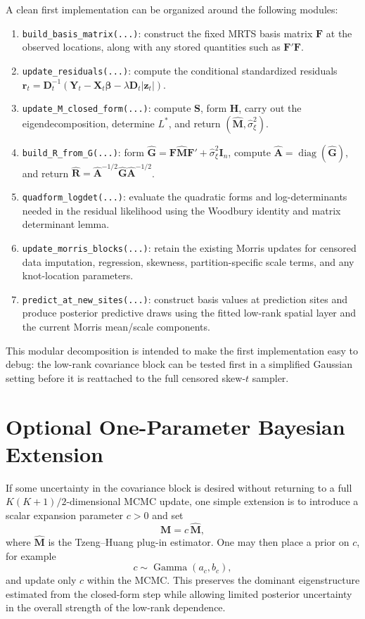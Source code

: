\documentclass[11pt]{article}
\newcommand{\bY}{\mathbf{Y}}
\newcommand{\bX}{\mathbf{X}}
\newcommand{\bD}{\mathbf{D}}
\newcommand{\bF}{\mathbf{F}}
\newcommand{\bH}{\mathbf{H}}
\newcommand{\bG}{\mathbf{G}}
\newcommand{\bM}{\mathbf{M}}
\newcommand{\bR}{\mathbf{R}}
\newcommand{\bA}{\mathbf{A}}
\newcommand{\bS}{\mathbf{S}}
\newcommand{\bz}{\mathbf{z}}
\newcommand{\br}{\mathbf{r}}
\newcommand{\diag}{\operatorname{diag}}
\newcommand{\I}{\mathbf{I}}
\begin{document}
A clean first implementation can be organized around the following modules:
\begin{enumerate}[leftmargin=2em]
\item \texttt{build\_basis\_matrix(...)}:
construct the fixed MRTS basis matrix $\bF$ at the observed locations, along
with any stored quantities such as $\bF' \bF$.
\item \texttt{update\_residuals(...)}:
compute the conditional standardized residuals
$\br_t = \bD_t^{-1}(\bY_t - \bX_t \bm{\beta} - \lambda \bD_t |\bz_t|)$.
\item \texttt{update\_M\_closed\_form(...)}:
compute $\bS$, form $\bH$, carry out the eigendecomposition, determine $L^*$,
and return $(\widehat{\bM}, \widehat{\sigma}_\xi^2)$.
\item \texttt{build\_R\_from\_G(...)}:
form $\widehat{\bG} = \bF \widehat{\bM} \bF' + \widehat{\sigma}_\xi^2 \I_n$,
compute $\widehat{\bA} = \diag(\widehat{\bG})$, and return
$\widehat{\bR} = \widehat{\bA}^{-1/2} \widehat{\bG} \widehat{\bA}^{-1/2}$.
\item \texttt{quadform\_logdet(...)}:
evaluate the quadratic forms and log-determinants needed in the residual
likelihood using the Woodbury identity and matrix determinant lemma.
\item \texttt{update\_morris\_blocks(...)}:
retain the existing Morris updates for censored data imputation, regression,
skewness, partition-specific scale terms, and any knot-location parameters.
\item \texttt{predict\_at\_new\_sites(...)}:
construct basis values at prediction sites and produce posterior predictive
draws using the fitted low-rank spatial layer and the current Morris mean/scale
components.
\end{enumerate}

This modular decomposition is intended to make the first implementation easy to
debug: the low-rank covariance block can be tested first in a simplified
Gaussian setting before it is reattached to the full censored skew-$t$ sampler.

\section{Optional One-Parameter Bayesian Extension}

If some uncertainty in the covariance block is desired without returning to a
full $K(K+1)/2$-dimensional MCMC update, one simple extension is to introduce a
scalar expansion parameter $c > 0$ and set
\[
\bM = c \, \widehat{\bM},
\]
where $\widehat{\bM}$ is the Tzeng--Huang plug-in estimator. One may then place
a prior on $c$, for example
\[
c \sim \operatorname{Gamma}(a_c, b_c),
\]
and update only $c$ within the MCMC. This preserves the dominant eigenstructure
estimated from the closed-form step while allowing limited posterior
uncertainty in the overall strength of the low-rank dependence.
\end{document}
